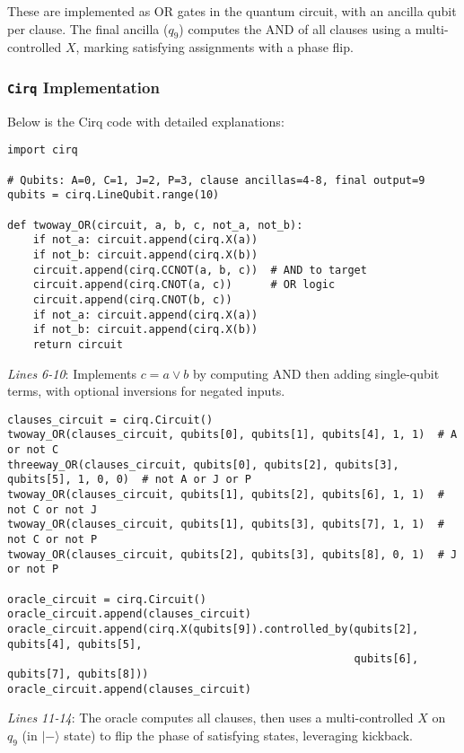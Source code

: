 These are implemented as OR gates in the quantum circuit, with an
ancilla qubit per clause. The final ancilla ($q_9$) computes the AND of all
clauses using a multi-controlled $X$, marking satisfying assignments with a
phase flip.


\subsubsection*{\texttt{Cirq} Implementation}

Below is the Cirq code with detailed explanations:

\begin{verbatim}
import cirq

# Qubits: A=0, C=1, J=2, P=3, clause ancillas=4-8, final output=9
qubits = cirq.LineQubit.range(10)

def twoway_OR(circuit, a, b, c, not_a, not_b):
    if not_a: circuit.append(cirq.X(a))
    if not_b: circuit.append(cirq.X(b))
    circuit.append(cirq.CCNOT(a, b, c))  # AND to target
    circuit.append(cirq.CNOT(a, c))      # OR logic
    circuit.append(cirq.CNOT(b, c))
    if not_a: circuit.append(cirq.X(a))
    if not_b: circuit.append(cirq.X(b))
    return circuit
\end{verbatim}
\textit{Lines 6-10}: Implements $c = a \lor b$ by computing AND then adding
single-qubit terms, with optional inversions for negated inputs.

\begin{verbatim}
clauses_circuit = cirq.Circuit()
twoway_OR(clauses_circuit, qubits[0], qubits[1], qubits[4], 1, 1)  # A or not C
threeway_OR(clauses_circuit, qubits[0], qubits[2], qubits[3], qubits[5], 1, 0, 0)  # not A or J or P
twoway_OR(clauses_circuit, qubits[1], qubits[2], qubits[6], 1, 1)  # not C or not J
twoway_OR(clauses_circuit, qubits[1], qubits[3], qubits[7], 1, 1)  # not C or not P
twoway_OR(clauses_circuit, qubits[2], qubits[3], qubits[8], 0, 1)  # J or not P

oracle_circuit = cirq.Circuit()
oracle_circuit.append(clauses_circuit)
oracle_circuit.append(cirq.X(qubits[9]).controlled_by(qubits[2], qubits[4], qubits[5],
                                                      qubits[6], qubits[7], qubits[8]))
oracle_circuit.append(clauses_circuit)
\end{verbatim}
\textit{Lines 11-14}: The oracle computes all clauses, then uses a
multi-controlled $X$ on $q_9$ (in $|-\rangle$ state) to flip the phase of
satisfying states, leveraging kickback.

